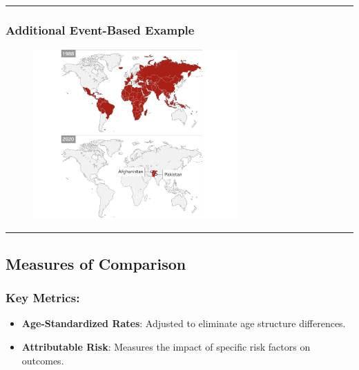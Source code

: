 \documentclass[
  letterpaper,
  DIV=11,
  numbers=noendperiod]{scrartcl}
\providecommand{\tightlist}{%
  \setlength{\itemsep}{0pt}\setlength{\parskip}{0pt}}\usepackage{longtable,booktabs,array}
\begin{document}
\begin{center}\rule{0.5\linewidth}{0.5pt}\end{center}

\hypertarget{additional-event-based-example}{%
\subsubsection{\texorpdfstring{{\textbf{Additional Event-Based
Example}}}{Additional Event-Based Example}}\label{additional-event-based-example}}

\begin{figure}

{\centering \includegraphics[width=0.7\textwidth,height=\textheight]{week2_files/imgs/polio2.jpg}

}

\end{figure}

\begin{center}\rule{0.5\linewidth}{0.5pt}\end{center}

\hypertarget{measures-of-comparison}{%
\subsection{\texorpdfstring{{\textbf{Measures of
Comparison}}}{Measures of Comparison}}\label{measures-of-comparison}}

\hypertarget{key-metrics-1}{%
\subsubsection{\texorpdfstring{{\textbf{Key
Metrics}}:}{Key Metrics:}}\label{key-metrics-1}}

\begin{itemize}
\tightlist
\item
  \textbf{Age-Standardized Rates}: Adjusted to eliminate age structure
  differences.
\item
  \textbf{Attributable Risk}: Measures the impact of specific risk
  factors on outcomes.
\end{itemize}
\end{document}
